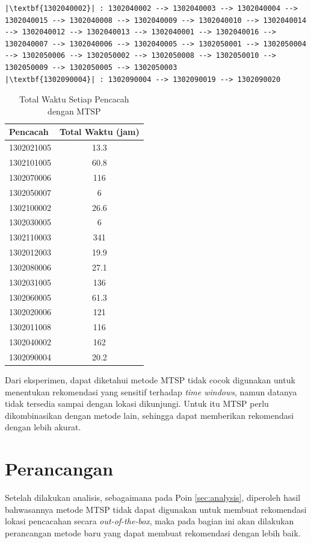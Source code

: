 \begin{listing}
\begin{verbatim}
|\textbf{1302040002}| : 1302040002 --> 1302040003 --> 1302040004 --> 1302040015 --> 1302040008 --> 1302040009 --> 1302040010 --> 1302040014 --> 1302040012 --> 1302040013 --> 1302040001 --> 1302040016 --> 1302040007 --> 1302040006 --> 1302040005 --> 1302050001 --> 1302050004 --> 1302050006 --> 1302050002 --> 1302050008 --> 1302050010 --> 1302050009 --> 1302050005 --> 1302050003
|\textbf{1302090004}| : 1302090004 --> 1302090019 --> 1302090020
	\end{verbatim}
\end{listing}


\begin{table}
	\centering
	\caption{Total Waktu Setiap Pencacah dengan MTSP}
	\label{tbl:enumerators_total_time}
	\begin{tabular}{lc}
		\toprule
			Pencacah & Total Waktu (jam)\\
		\midrule
			1302021005 & 13.3\\
			1302101005 & 60.8\\
			1302070006 & 116\\
			1302050007 & 6\\
			1302100002 & 26.6\\
			1302030005 & 6\\
			1302110003 & 341\\
			1302012003 & 19.9\\
			1302080006 & 27.1\\
			1302031005 & 136\\
			1302060005 & 61.3\\
			1302020006 & 121\\
			1302011008 & 116\\
			1302040002 & 162\\
			1302090004 & 20.2\\
		\bottomrule
	\end{tabular}
\end{table}


Dari eksperimen, dapat diketahui metode MTSP tidak cocok digunakan untuk menentukan rekomendasi yang sensitif terhadap \textit{time windows}, namun datanya tidak tersedia sampai dengan lokasi dikunjungi. Untuk itu MTSP perlu dikombinasikan dengan metode lain, sehingga dapat memberikan rekomendasi dengan lebih akurat.


\section{Perancangan}
Setelah dilakukan analisis, sebagaimana pada Poin \ref{sec:analysis}, diperoleh hasil bahwasannya metode MTSP tidak dapat digunakan untuk membuat rekomendasi lokasi pencacahan secara \textit{out-of-the-box}, maka pada bagian ini akan dilakukan perancangan metode baru yang dapat membuat rekomendasi dengan lebih baik.


